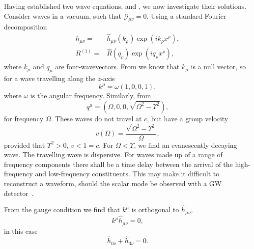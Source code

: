 Having established two wave equations,  and , we now investigate their solutions. Consider waves in a vacuum, such that $\mathcal{G}_{\mu\nu} = 0$. Using a standard Fourier decomposition
\begin{align}
\overline{h}_{\mu\nu} = {} & \widehat{h}_{\mu\nu}(k_\rho) \exp\left(ik_\rho x^\rho\right),\\
R^{(1)} = {} & \widehat{R}(q_\rho) \exp\left(iq_\rho x^\rho\right),
\end{align}
where $k_\mu$ and $q_\mu$ are four-wavevectors. From  we know that $k_\mu$ is a null vector, so for a wave travelling along the $z$-axis
\begin{equation}
k^\mu = \omega(1, 0, 0, 1),
\end{equation}
where $\omega$ is the angular frequency. Similarly, from 
\begin{equation}
q^\mu = \left(\Omega, 0, 0, \sqrt{\Omega^2 - \Upsilon^2}\right),
\label{eq:Ricci_q}
\end{equation}
for frequency $\Omega$. These waves do not travel at $c$, but have a group velocity
\begin{equation}
v(\Omega) = \frac{\sqrt{\Omega^2 - \Upsilon^2}}{\Omega},
\end{equation}
provided that $\Upsilon^2 > 0$, $v < 1 = c$. For $\Omega < \Upsilon$, we find an evanescently decaying wave. The travelling wave is dispersive. For waves made up of a range of frequency components there shall be a time delay between the arrival of the high-frequency and low-frequency constituents. This may make it difficult to reconstruct a waveform, should the scalar mode be observed with a GW detector~\cite{Corda2009a}.

From the gauge condition  we find that $k^\mu$ is orthogonal to $\widehat{h}_{\mu\nu}$,
\begin{equation}
k^\mu\widehat{h}_{\mu\nu} = 0,
\end{equation}
in this case
\begin{equation}
\widehat{h}_{0\nu} + \widehat{h}_{3\nu} = 0.
\label{eq:Transverse}
\end{equation}

